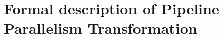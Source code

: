\documentclass[sigplan]{acmart}\settopmatter{printfolios=true,printccs=false,printacmref=false}
\begin{document}
 \section{Formal description of Pipeline Parallelism Transformation}\label{formalpipe}
\end{document}

